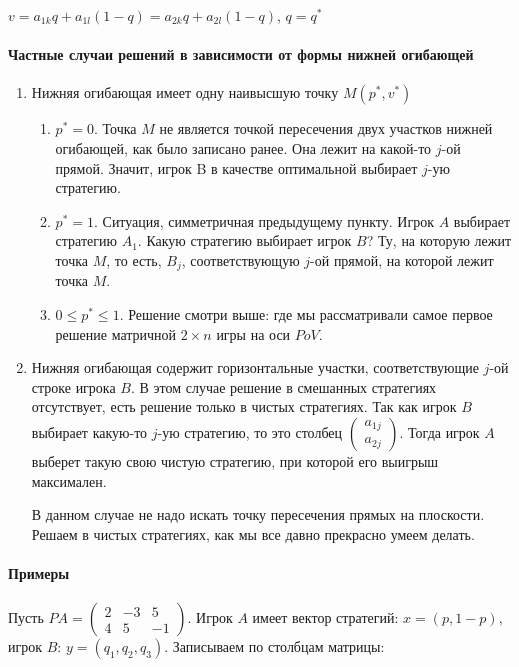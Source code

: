 \documentclass{article}
\begin{document}
$v = a_{1k} q + a_{1l} (1 - q) = a_{2k} q + a_{2l} (1 - q)$, $q=q^{*}$

\paragraph{Частные случаи решений в зависимости от формы нижней огибающей}

\begin{enumerate}
	\item Нижняя огибающая имеет одну наивысшую точку $M(p^{*}, v^{*})$
	\begin{enumerate}
		\item $p^{*} = 0$. Точка $M$ не является точкой пересечения двух участков нижней огибающей, как было записано ранее. Она лежит на какой-то $j$-ой прямой. Значит, игрок B в качестве оптимальной выбирает $j$-ую стратегию.
		\item $p^{*} = 1$. Ситуация, симметричная предыдущему пункту. Игрок $A$ выбирает стратегию $A_{1}$. Какую стратегию выбирает игрок $B$? Ту, на которую лежит точка $M$, то есть, $B_{j}$, соответствующую $j$-ой прямой, на которой лежит точка $M$.
		\item $0 \le p^{*} \le 1$. Решение смотри выше: где мы рассматривали самое первое решение матричной $2 \times n$ игры на оси $PoV$.
	\end{enumerate}
	\item Нижняя огибающая содержит горизонтальные участки, соответствующие $j$-ой строке игрока $B$. В этом случае решение в смешанных стратегиях отсутствует, есть решение только в чистых стратегиях. Так как игрок $B$ выбирает какую-то $j$-ую стратегию, то это столбец $\begin{pmatrix} a_{1j} \\ a_{2j} \end{pmatrix}$. Тогда игрок $A$ выберет такую свою чистую стратегию, при которой его выигрыш максимален.

В данном случае не надо искать точку пересечения прямых на плоскости. Решаем в чистых стратегиях, как мы все давно прекрасно умеем делать.
\end{enumerate}

\paragraph{Примеры}

Пусть $P{A} = \begin{pmatrix}
	2 & -3 & 5 \\
	4 &  5 & -1
\end{pmatrix}$. Игрок $A$ имеет вектор стратегий: $x = (p, 1 - p)$, игрок $B$: $y = (q_1, q_2, q_3)$. Записываем по столбцам матрицы:
\end{document}
